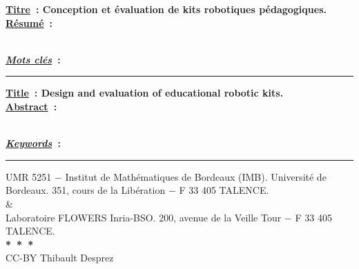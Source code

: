 \pagestyle{empty}
\addtolength{\evensidemargin}{-\reliure}
\footnotesize{}
{\hfill\textbf{\small\underline{Titre}~:  Conception et évaluation de kits robotiques pédagogiques.}}\\
\textbf{\footnotesize\underline{R\'esum\'e}~:} \\
\resume
\\\vspace{-0.1cm}

{\textbf{\underline{\textit{Mots cl\'{e}s}}~: \motscle}}\\
\hrule
\vspace{0.3cm}

{\hfill\textbf{\small\underline{Title}~: Design and evaluation of educational robotic kits.}}\\
\textbf{\underline{Abstract}~:}\\
\abst
\\\vspace{-0.1cm}

{\textbf{\underline{\textit{Keywords}}~: \keysword}}\\

\vspace{0.45cm}
\hrule
\begin{center}
{\scriptsize{UMR 5251 $-$ Institut de Math\'ematiques de Bordeaux (IMB).
Universit\'e de Bordeaux. 351, cours de la Lib\'eration $-$  F 33 405 TALENCE.\\
\&\\
Laboratoire FLOWERS Inria-BSO. 200, avenue de la Veille Tour $-$  F 33 405 TALENCE.\\\vspace{0.1cm}\textbf{*~*~*}\\
\footnotesize{CC-BY Thibault Desprez}}}
\end{center}
\toPrint